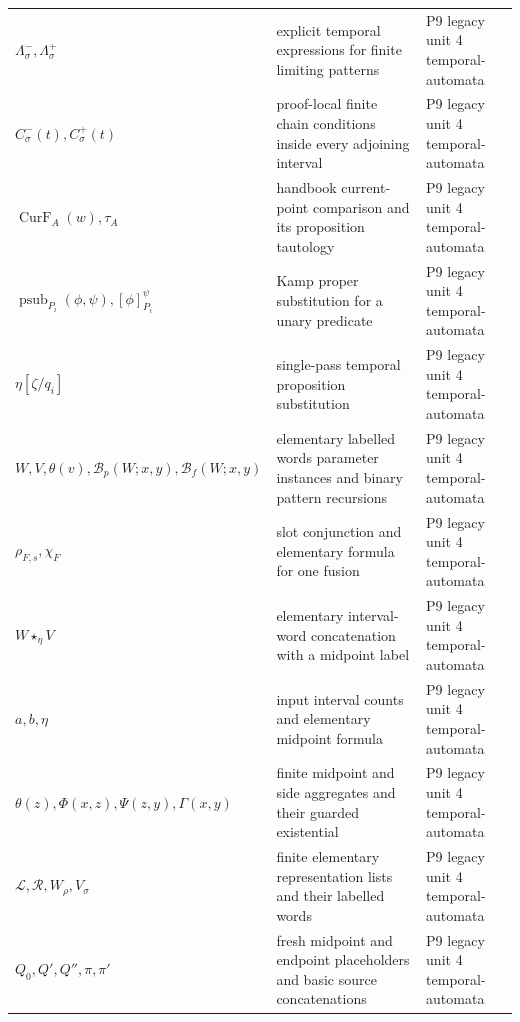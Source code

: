 \begin{longtable}{@{}p{}p{}p{}@{}}
\(\Lambda^-_\sigma,\allowbreak \Lambda^+_\sigma\) & explicit temporal expressions for finite limiting patterns & P9 legacy unit 4 temporal-\allowbreak{}automata \\
\(C^-_\sigma(t),\allowbreak C^+_\sigma(t)\) & proof-local finite chain conditions inside every adjoining interval & P9 legacy unit 4 temporal-\allowbreak{}automata \\
\(\operatorname{CurF}_A(w),\allowbreak \tau_A\) & handbook current-point comparison and its proposition tautology & P9 legacy unit 4 temporal-\allowbreak{}automata \\
\(\operatorname{psub}_{P_i}(\phi,\allowbreak \psi),\allowbreak [\phi]^\psi_{P_i}\) & Kamp proper substitution for a unary predicate & P9 legacy unit 4 temporal-\allowbreak{}automata \\
\(\eta[\zeta/q_i]\) & single-pass temporal proposition substitution & P9 legacy unit 4 temporal-\allowbreak{}automata \\
\(W,\allowbreak V,\allowbreak \theta(v),\allowbreak \mathcal B_p(W;\allowbreak x,\allowbreak y),\allowbreak \mathcal B_f(W;\allowbreak x,\allowbreak y)\) & elementary labelled words parameter instances and binary pattern recursions & P9 legacy unit 4 temporal-\allowbreak{}automata \\
\(\rho_{F,s},\allowbreak \chi_F\) & slot conjunction and elementary formula for one fusion & P9 legacy unit 4 temporal-\allowbreak{}automata \\
\(W\mathbin{\star_\eta}V\) & elementary interval-word concatenation with a midpoint label & P9 legacy unit 4 temporal-\allowbreak{}automata \\
\(a,\allowbreak b,\allowbreak \eta\) & input interval counts and elementary midpoint formula & P9 legacy unit 4 temporal-\allowbreak{}automata \\
\(\theta(z),\allowbreak \Phi(x,\allowbreak z),\allowbreak \Psi(z,\allowbreak y),\allowbreak \Gamma(x,\allowbreak y)\) & finite midpoint and side aggregates and their guarded existential & P9 legacy unit 4 temporal-\allowbreak{}automata \\
\(\mathcal L,\allowbreak \mathcal R,\allowbreak W_\rho,\allowbreak V_\sigma\) & finite elementary representation lists and their labelled words & P9 legacy unit 4 temporal-\allowbreak{}automata \\
\(Q_0,\allowbreak Q',\allowbreak Q'',\allowbreak \pi,\allowbreak \pi'\) & fresh midpoint and endpoint placeholders and basic source concatenations & P9 legacy unit 4 temporal-\allowbreak{}automata \\

\end{longtable}
